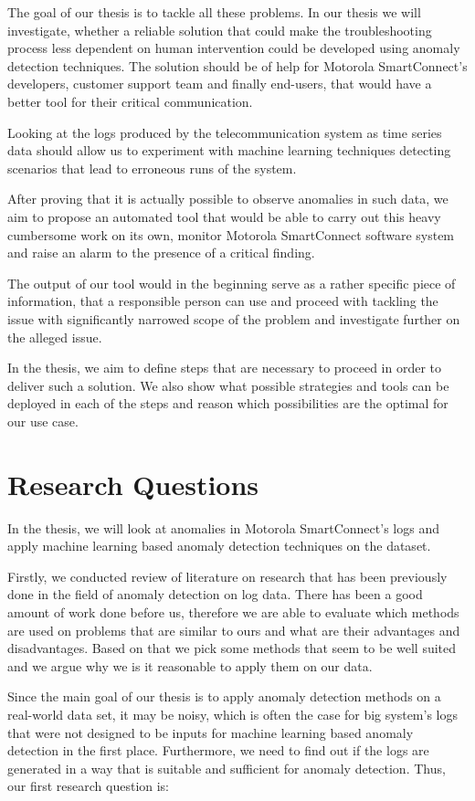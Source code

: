 The goal of our thesis is to tackle all these problems. 
In our thesis we will investigate, whether a reliable solution that could make the troubleshooting process less dependent on human intervention could be developed using anomaly detection techniques.
The solution should be of help for Motorola SmartConnect's developers, customer support team and finally end-users, that would have a better tool for their critical communication.

Looking at the logs produced by the telecommunication system as time series data should allow us to experiment with machine learning techniques detecting scenarios that lead to erroneous runs of the system.

After proving that it is actually possible to observe anomalies in such data, we aim to propose an automated tool that would be able to carry out this heavy cumbersome work on its own, monitor Motorola SmartConnect software system and raise an alarm to the presence of a critical finding.

The output of our tool would in the beginning serve as a rather specific piece of information, that a responsible person can use and proceed with tackling the issue with significantly narrowed scope of the problem and investigate further on the alleged issue.

In the thesis, we aim to define steps that are necessary to proceed in order to deliver such a solution. We also show what possible strategies and tools can be deployed in each of the steps and reason which possibilities are the optimal for our use case.


\section{Research Questions}

In the thesis, we will look at anomalies in Motorola SmartConnect's logs and apply machine learning based anomaly detection techniques on the dataset.

Firstly, we conducted review of literature on research that has been previously done in the field of anomaly detection on log data. There has been a good amount of work done before us, therefore we are able to evaluate which methods are used on problems that are similar to ours and what are their advantages and disadvantages. Based on that we pick some methods that seem to be well suited and we argue why we is it reasonable to apply them on our data.

Since the main goal of our thesis is to apply anomaly detection methods on a real-world data set, it may be noisy, which is often the case for big system's logs that were not designed to be inputs for machine learning based anomaly detection in the first place. 
Furthermore, we need to find out if the logs are generated in a way that is suitable and sufficient for anomaly detection. Thus, our first research question is:\\

